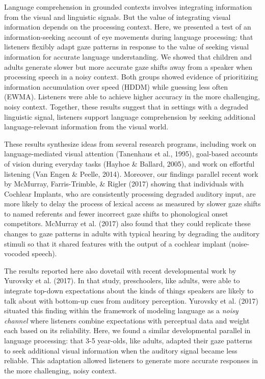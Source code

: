 \documentclass[10pt, letterpaper]{article}
\begin{document}
Language comprehension in grounded contexts involves integrating
information from the visual and linguistic signals. But the value of
integrating visual information depends on the processing context. Here,
we presented a test of an information-seeking account of eye movements
during language processing: that listeners flexibly adapt gaze patterns
in response to the value of seeking visual information for accurate
language understanding. We showed that children and adults generate
slower but more accurate gaze shifts away from a speaker when processing
speech in a noisy context. Both groups showed evidence of prioritizing
information accumulation over speed (HDDM) while guessing less often
(EWMA). Listeners were able to achieve higher accuracy in the more
challenging, noisy context. Together, these results suggest that in
settings with a degraded linguistic signal, listeners support language
comprehension by seeking additional language-relevant information from
the visual world.

These results synthesize ideas from several research programs, including
work on language-mediated visual attention (Tanenhaus et al., 1995),
goal-based accounts of vision during everyday tasks (Hayhoe \& Ballard,
2005), and work on effortful listening (Van Engen \& Peelle, 2014).
Moreover, our findings parallel recent work by McMurray, Farris-Trimble,
\& Rigler (2017) showing that individuals with Cochlear Implants, who
are consistently processing degraded auditory input, are more likely to
delay the process of lexical access as measured by slower gaze shifts to
named referents and fewer incorrect gaze shifts to phonological onset
competitors. McMurray et al. (2017) also found that they could replicate
these changes to gaze patterns in adults with typical hearing by
degrading the auditory stimuli so that it shared features with the
output of a cochlear implant (noise-vocoded speech).

The results reported here also dovetail with recent developmental work
by Yurovsky et al. (2017). In that study, preschoolers, like adults,
were able to integrate top-down expectations about the kinds of things
speakers are likely to talk about with bottom-up cues from auditory
perception. Yurovsky et al. (2017) situated this finding within the
framework of modeling language as a \emph{noisy channel} where listeners
combine expectations with perceptual data and weight each based on its
reliability. Here, we found a similar developmental parallel in language
processing: that 3-5 year-olds, like adults, adapted their gaze patterns
to seek additional visual information when the auditory signal became
less reliable. This adaptation allowed listeners to generate more
accurate responses in the more challenging, noisy context.
\end{document}
